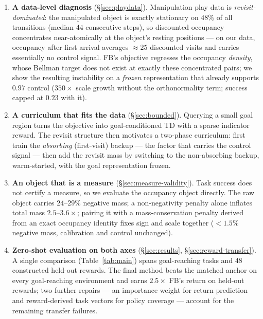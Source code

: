 \documentclass{article}
\begin{document}
\begin{enumerate}
    \item \textbf{A data-level diagnosis} (\S\ref{sec:playdata}). Manipulation
    play data is \emph{revisit-dominated}: the manipulated object is exactly
    stationary on $48\%$ of all transitions (median $44$ consecutive steps),
    so discounted occupancy concentrates near-atomically at the object's
    resting positions --- on our data, occupancy after first arrival averages
    $\approx\!25$ discounted visits and carries essentially no control signal.
    FB's objective regresses the occupancy \emph{density}, whose Bellman
    target does not exist at exactly these concentrated pairs; we show the
    resulting instability on a \emph{frozen} representation that already
    supports $0.97$ control ($350\times$ scale growth without the
    orthonormality term; success capped at $0.23$ with it).
    \item \textbf{A curriculum that fits the data} (\S\ref{sec:bounded}).
    Querying a small goal region turns the objective into goal-conditioned TD
    with a sparse indicator reward. The revisit structure then motivates a
    two-phase curriculum: first train the \emph{absorbing} (first-visit)
    backup --- the factor that carries the control signal --- then add the
    revisit mass by switching to the non-absorbing backup, warm-started, with
    the goal representation frozen.
    \item \textbf{An object that is a measure} (\S\ref{sec:measure-validity}).
    Task success does not certify a measure, so we evaluate the occupancy
    object directly. The raw object carries $24$--$29\%$ negative mass; a
    non-negativity penalty alone inflates total mass $2.5$--$3.6\times$;
    pairing it with a mass-conservation penalty derived from an exact
    occupancy identity fixes sign and scale together ($<1.5\%$ negative mass,
    calibration and control unchanged).
    \item \textbf{Zero-shot evaluation on both axes}
    (\S\ref{sec:results}, \S\ref{sec:reward-transfer}). A single comparison
    (Table~\ref{tab:main}) spans goal-reaching tasks and $48$ constructed
    held-out rewards. The final method beats the matched anchor on every
    goal-reaching environment and earns $2.5\times$ FB's return on held-out
    rewards; two further repairs --- an importance weight for return
    prediction and reward-derived task vectors for policy coverage --- account
    for the remaining transfer failures.
\end{enumerate}
\end{document}
